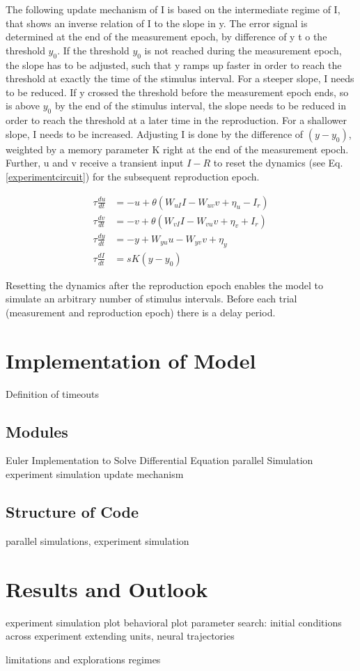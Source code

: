 \documentclass[9pt]{article}
\begin{document}
The following update mechanism of I is based on the intermediate regime of I, that shows an inverse relation of I to the slope in y.
The error signal is determined at the end of the measurement epoch, by difference of y t o the threshold $y_0$.
If the threshold $y_0$ is not reached during the measurement epoch, the slope has to be adjusted, such that y ramps up faster in order to reach the threshold at exactly the time of the stimulus interval. For a steeper slope, I needs to be reduced.
If y crossed the threshold before the measurement epoch ends, so is above $y_0$ by the end of the stimulus interval, the slope needs to be reduced in order to reach the threshold at a later time in the reproduction. For a shallower slope, I needs to be increased.
Adjusting I is done by the difference of $(y-y_0)$, weighted by a memory parameter K right at the end of the measurement epoch. Further, u and v receive a transient input $I-R$ to reset the dynamics (see Eq. \ref{experimentcircuit}) for the subsequent reproduction epoch. 

\begin{equation} \label{experimentcircuit}
	\begin{split}
	\tau\frac{du}{dt} & = -u + \theta(W_{uI}I - W_{uv}v + \eta_u - I_r) \\
	\tau\frac{dv}{dt} & = -v + \theta(W_{vI}I - W_{vu}v + \eta_v + I_r) \\
	\tau\frac{dy}{dt} & = -y + W_{yu}u - W_{yv}v + \eta_y \\
	\tau\frac{dI}{dt} & = sK(y-y_0)
	\end{split}
\end{equation}

Resetting the dynamics after the reproduction epoch enables the model to simulate an arbitrary number of stimulus intervals. Before each trial (measurement and reproduction epoch) there is a delay period.



\section{Implementation of Model}
Definition of timeouts
\subsection{Modules}
Euler Implementation to Solve Differential Equation
parallel Simulation
experiment simulation
update mechanism

\subsection{Structure of Code}
parallel simulations, experiment simulation

\section{Results and Outlook}
experiment simulation plot
behavioral plot
parameter search: initial conditions across experiment 
extending units, neural trajectories

limitations and explorations regimes 
\end{document}
